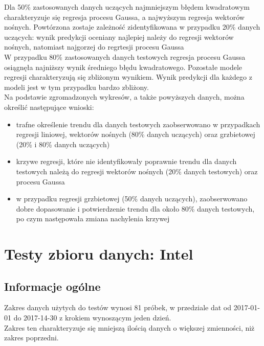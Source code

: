 Dla 50\% zastosowanych danych uczących najmniejszym błędem kwadratowym charakteryzuje się regresja procesu Gaussa, a najwyższym regresja wektorów nośnych.
Powtórzona zostaje zależność zidentyfikowana w przypadku 20\% danych uczących: wynik predykcji oceniany najlepiej należy do regresji wektorów nośnych, natomiast najgorzej do regrtesji procesu Gaussa\\

W przypadku 80\% zastosowanych danych testowych regresja procesu Gaussa osiągnęła najniższy wynik średniego błędu kwadratowego. Pozostałe modele regresji charakteryzują się zbliżonym wynikiem.
Wynik predykcji dla każdego z modeli jest w tym przypadku bardzo zbliżony.\\

Na podstawie zgromadzonych wykresów, a także powyższych danych, można określić następujące wnioski:
\begin{itemize}
 \item trafne określenie trendu dla danych testowych zaobserwowano w przypadkach regresji liniowej, wektorów nośnych (80\% danych uczących) oraz grzbietowej (20\% i 80\% danych uczących)
 \item krzywe regresji, które nie identyfikowały poprawnie trendu dla danych testowych należą do regresji wektorów nośnych (20\% danych testowych) oraz procesu Gaussa
 \item w przypadku regresji grzbietowej (50\% danych uczących), zaobserwowano dobre dopasowanie i potwierdzenie trendu dla około 80\% danych testowych, po czym następowała zmiana nachylenia krzywej
\end{itemize}


\section{Testy zbioru danych: Intel}

\subsection{Informacje ogólne}
Zakres danych użytych do testów wynosi 81 próbek, w przedziale dat od 2017-01-01 do 2017-14-30 z krokiem wynoszącym jeden dzień.\\
Zakres ten charakteryzuje się mniejszą ilością danych o większej zmienności, niż zakres poprzedni.

